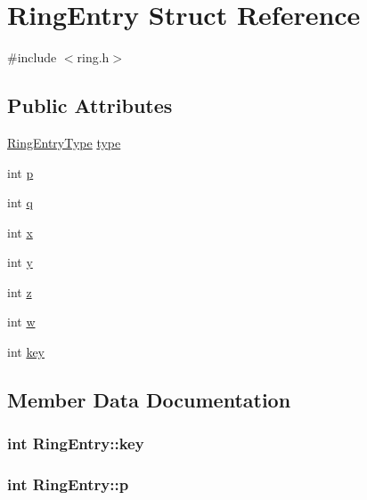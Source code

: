 \hypertarget{structRingEntry}{}\section{Ring\+Entry Struct Reference}
\label{structRingEntry}


{\ttfamily \#include $<$ring.\+h$>$}

\subsection*{Public Attributes}
\begin{DoxyCompactItemize}
\item 
\hyperlink{ring_8h_a0020edd7e28d219c1fcaa2fce15d420d}{Ring\+Entry\+Type} \hyperlink{structRingEntry_afc77cc123c354240feba6e92dd4ee882}{type}
\item 
int \hyperlink{structRingEntry_a8b01eb77bb24ee7243b3c4966475f5d1}{p}
\item 
int \hyperlink{structRingEntry_ae944a4f58e8d867035a9d94366615ff2}{q}
\item 
int \hyperlink{structRingEntry_a1d73e65971815248e917087ca69afd63}{x}
\item 
int \hyperlink{structRingEntry_a7f50629b87d74360c6726903cf1452d2}{y}
\item 
int \hyperlink{structRingEntry_a8b88d0f404a59333eae214698675c712}{z}
\item 
int \hyperlink{structRingEntry_a5c4cd66b932f7f6c430b12b9b6dc4007}{w}
\item 
int \hyperlink{structRingEntry_a94645a5a7b12ad82ed76dce5fd5e1f2c}{key}
\end{DoxyCompactItemize}


\subsection{Member Data Documentation}
\subsubsection[{\texorpdfstring{key}{key}}]{\setlength{\rightskip}{0pt plus 5cm}int Ring\+Entry\+::key}\hypertarget{structRingEntry_a94645a5a7b12ad82ed76dce5fd5e1f2c}{}\label{structRingEntry_a94645a5a7b12ad82ed76dce5fd5e1f2c}
\subsubsection[{\texorpdfstring{p}{p}}]{\setlength{\rightskip}{0pt plus 5cm}int Ring\+Entry\+::p}\hypertarget{structRingEntry_a8b01eb77bb24ee7243b3c4966475f5d1}{}\label{structRingEntry_a8b01eb77bb24ee7243b3c4966475f5d1}
